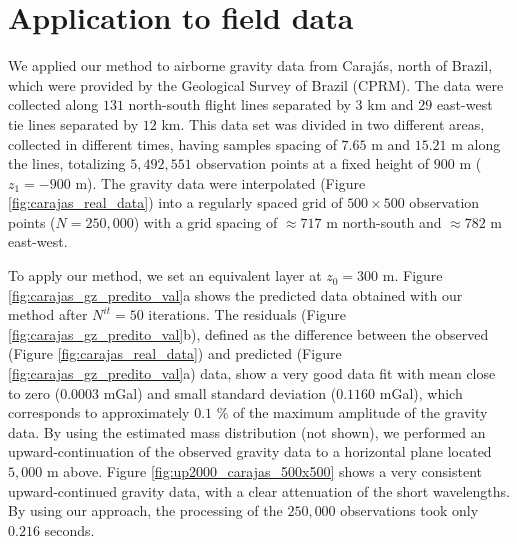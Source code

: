 \section{Application to field data}

We applied our method to airborne gravity data from Caraj{\'a}s, north of Brazil, which were provided by 
the Geological Survey of Brazil (CPRM). The data were collected along $131$ north-south flight lines separated 
by $3$ km and $29$ east-west tie lines separated by $12$ km.
This data set was divided in two different areas, collected in different times, having samples spacing of 
$7.65$ m and $15.21$ m along the lines, totalizing  $5,492,551$ observation points at a fixed height 
of $900$ m ($z_{1} = -900$ m). 
The gravity data were interpolated (Figure \ref{fig:carajas_real_data}) into a regularly spaced grid of 
$500 \times 500$ observation points ($N = 250,000$) with a grid spacing of 
$\approx 717$ m north-south and $\approx 782$ m east-west.

To apply our method, we set an equivalent layer at $z_{0} = 300$ m. 
Figure \ref{fig:carajas_gz_predito_val}a shows the predicted data obtained with our method after 
$N^{it} = 50$ iterations.
The residuals (Figure \ref{fig:carajas_gz_predito_val}b), defined as the difference between the observed 
(Figure \ref{fig:carajas_real_data}) and predicted (Figure \ref{fig:carajas_gz_predito_val}a) data, show a 
very good data fit with mean close to zero ($0.0003$ mGal) and small standard deviation ($0.1160$ mGal), 
which corresponds to approximately $0.1$ \% of the maximum amplitude of the gravity data.
By using the estimated mass distribution (not shown), we performed an upward-continuation of the 
observed gravity data to a horizontal plane located $5,000$ m above. Figure \ref{fig:up2000_carajas_500x500} 
shows a very consistent upward-continued gravity data, with a clear attenuation of the short 
wavelengths. By using our approach, the processing of the $250,000$ observations took only 
$0.216$ seconds.